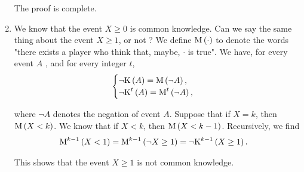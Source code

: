 \begin{enumerate}[label=\alph*.]
  The proof is complete.
  
  
  \item We know that the event $X \geq 0$ is common knowledge. Can we say the same thing about the event $X \geq 1$, or not ?
  We define $\text{M} \left(\cdot\right)$ to denote the words "there exists a player who think that, maybe, $\cdot$ is true". We have, for every event $A$ , and for every integer $t$, 
  \begin{equation*}
      \begin{cases}
        \neg \text{K} \left(A\right) = \text{M} \left(\neg A\right), \\
        \neg \text{K}^{t} \left(A\right) = \text{M}^{t} \left(\neg A\right),
      \end{cases}
  \end{equation*}
  
  where $\neg A$ denotes the negation of event $A$. Suppose that if $X = k$, then $\text{M} \left(X < k\right)$.
  We know that if $X < k$, then $\text{M} \left(X < k-1\right)$. Recursively, we find
  \begin{align*}
      \text{M}^{k-1} \left(X < 1\right)
      &= \text{M}^{k-1} \left( \neg X \geq 1\right)
      = \neg \text{K}^{k-1} \left(X \geq 1\right).
  \end{align*}
  
  This shows that the event $X \geq 1$ is not common knowledge.
  
  
\end{enumerate}
